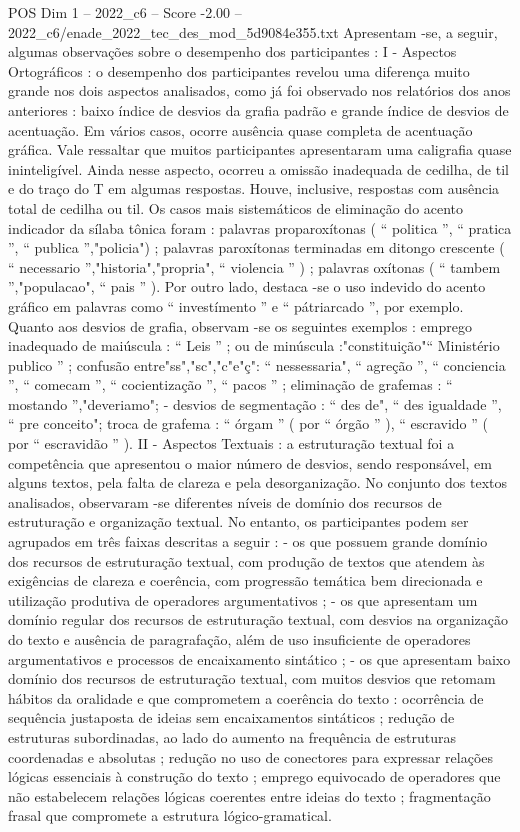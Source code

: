 \begin{textsample}{POS Dim 1 – 2022\_c6 – Score -2.00 – 2022\_c6/enade\_2022\_tec\_des\_mod\_5d9084e355.txt}
Apresentam -se, a seguir, algumas observações sobre o desempenho dos participantes : I - Aspectos Ortográficos : o desempenho dos participantes revelou uma diferença muito grande nos dois aspectos analisados, como já foi observado nos relatórios dos anos anteriores : baixo índice de desvios da grafia padrão e grande índice de desvios de acentuação.
Em vários casos, ocorre ausência quase completa de acentuação gráfica.
Vale ressaltar que muitos participantes apresentaram uma caligrafia quase ininteligível.
Ainda nesse aspecto, ocorreu a omissão inadequada de cedilha, de til e do traço do T em algumas respostas.
Houve, inclusive, respostas com ausência total de cedilha ou til.
Os casos mais sistemáticos de eliminação do acento indicador da sílaba tônica foram : palavras proparoxítonas ( “ politica ”, “ pratica ”, “ publica ”,"policia") ; palavras paroxítonas terminadas em ditongo crescente ( “ necessario ”,"historia","propria", “ violencia ” ) ; palavras oxítonas ( “ tambem ”,"populacao", “ pais ” ).
Por outro lado, destaca -se o uso indevido do acento gráfico em palavras como “ investímento ” e “ pátriarcado ”, por exemplo.
Quanto aos desvios de grafia, observam -se os seguintes exemplos : emprego inadequado de maiúscula : “ Leis ” ; ou de minúscula :"constituição"“ Ministério publico ” ; confusão entre"ss","sc","c"e"ç": “ nessessaria", “ agreção ”, “ conciencia ”, “ comecam ”, “ cocientização ”, “ pacos ” ; eliminação de grafemas : “ mostando ”,"deveriamo"; - desvios de segmentação : “ des de", “ des igualdade ”, “ pre conceito"; troca de grafema : “ órgam ” ( por “ órgão ” ), “ escravido ” ( por “ escravidão ” ).
II - Aspectos Textuais : a estruturação textual foi a competência que apresentou o maior número de desvios, sendo responsável, em alguns textos, pela falta de clareza e pela desorganização.
No conjunto dos textos analisados, observaram -se diferentes níveis de domínio dos recursos de estruturação e organização textual.
No entanto, os participantes podem ser agrupados em três faixas descritas a seguir : - os que possuem grande domínio dos recursos de estruturação textual, com produção de textos que atendem às exigências de clareza e coerência, com progressão temática bem direcionada e utilização produtiva de operadores argumentativos ; - os que apresentam um domínio regular dos recursos de estruturação textual, com desvios na organização do texto e ausência de paragrafação, além de uso insuficiente de operadores argumentativos e processos de encaixamento sintático ; - os que apresentam baixo domínio dos recursos de estruturação textual, com muitos desvios que retomam hábitos da oralidade e que comprometem a coerência do texto : ocorrência de sequência justaposta de ideias sem encaixamentos sintáticos ; redução de estruturas subordinadas, ao lado do aumento na frequência de estruturas coordenadas e absolutas ; redução no uso de conectores para expressar relações lógicas essenciais à construção do texto ; emprego equivocado de operadores que não estabelecem relações lógicas coerentes entre ideias do texto ; fragmentação frasal que compromete a estrutura lógico-gramatical.

\end{textsample}
